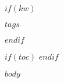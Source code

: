 \documentclass[a4paper,11pt,article,oneside]{memoir}
\subtitle{$subtitle$}
\date{\today}
\begin{document}

\begin{abstract}
$abstract$
\end{abstract}
%

$if(kw)$		%
\begin{keywords}
$tags$
\end{keywords}
$endif$


%
$if(toc)$		%
\tableofcontents
\pagebreak
\printglossaries
$endif$

\pagebreak


$body$




%
%	




\end{document}
